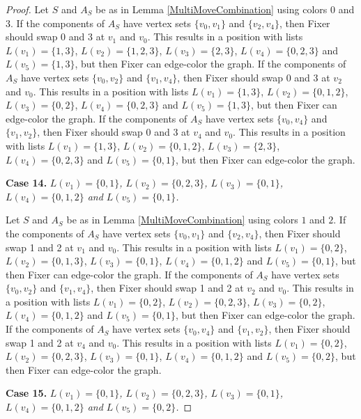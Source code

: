 \documentclass[12pt]{amsart}
\theoremstyle{plain}
\theoremstyle{definition}
\theoremstyle{remark}
\begin{document}
\begin{proof}
Let $S$ and $A_S$ be as in Lemma \ref{MultiMoveCombination} using colors $0$ and $3$. If the components of $A_S$ have vertex sets $\{v_0, v_1\}$ and $\{v_2, v_4\}$, then Fixer should swap 0 and 3 at $v_1$ and $v_0$. This results in a position with lists $L(v_1) = \{1, 3\}$, $L(v_2) = \{1, 2, 3\}$, $L(v_3) = \{2, 3\}$, $L(v_4) = \{0, 2, 3\}$ and $L(v_5) = \{1, 3\}$, but then Fixer can edge-color the graph.
If the components of $A_S$ have vertex sets $\{v_0, v_2\}$ and $\{v_1, v_4\}$, then Fixer should swap 0 and 3 at $v_2$ and $v_0$. This results in a position with lists $L(v_1) = \{1, 3\}$, $L(v_2) = \{0, 1, 2\}$, $L(v_3) = \{0, 2\}$, $L(v_4) = \{0, 2, 3\}$ and $L(v_5) = \{1, 3\}$, but then Fixer can edge-color the graph.
If the components of $A_S$ have vertex sets $\{v_0, v_4\}$ and $\{v_1, v_2\}$, then Fixer should swap 0 and 3 at $v_4$ and $v_0$. This results in a position with lists $L(v_1) = \{1, 3\}$, $L(v_2) = \{0, 1, 2\}$, $L(v_3) = \{2, 3\}$, $L(v_4) = \{0, 2, 3\}$ and $L(v_5) = \{0, 1\}$, but then Fixer can edge-color the graph.

\noindent\textbf{Case 14.  }\textit{$L(v_1) = \{0, 1\}$, $L(v_2) = \{0, 2, 3\}$, $L(v_3) = \{0, 1\}$, $L(v_4) = \{0, 1, 2\}$ and $L(v_5) = \{0, 1\}$.}

Let $S$ and $A_S$ be as in Lemma \ref{MultiMoveCombination} using colors $1$ and $2$. If the components of $A_S$ have vertex sets $\{v_0, v_1\}$ and $\{v_2, v_4\}$, then Fixer should swap 1 and 2 at $v_1$ and $v_0$. This results in a position with lists $L(v_1) = \{0, 2\}$, $L(v_2) = \{0, 1, 3\}$, $L(v_3) = \{0, 1\}$, $L(v_4) = \{0, 1, 2\}$ and $L(v_5) = \{0, 1\}$, but then Fixer can edge-color the graph.
If the components of $A_S$ have vertex sets $\{v_0, v_2\}$ and $\{v_1, v_4\}$, then Fixer should swap 1 and 2 at $v_2$ and $v_0$. This results in a position with lists $L(v_1) = \{0, 2\}$, $L(v_2) = \{0, 2, 3\}$, $L(v_3) = \{0, 2\}$, $L(v_4) = \{0, 1, 2\}$ and $L(v_5) = \{0, 1\}$, but then Fixer can edge-color the graph.
If the components of $A_S$ have vertex sets $\{v_0, v_4\}$ and $\{v_1, v_2\}$, then Fixer should swap 1 and 2 at $v_4$ and $v_0$. This results in a position with lists $L(v_1) = \{0, 2\}$, $L(v_2) = \{0, 2, 3\}$, $L(v_3) = \{0, 1\}$, $L(v_4) = \{0, 1, 2\}$ and $L(v_5) = \{0, 2\}$, but then Fixer can edge-color the graph.

\noindent\textbf{Case 15.  }\textit{$L(v_1) = \{0, 1\}$, $L(v_2) = \{0, 2, 3\}$, $L(v_3) = \{0, 1\}$, $L(v_4) = \{0, 1, 2\}$ and $L(v_5) = \{0, 2\}$.}


\end{proof}
\end{document}
